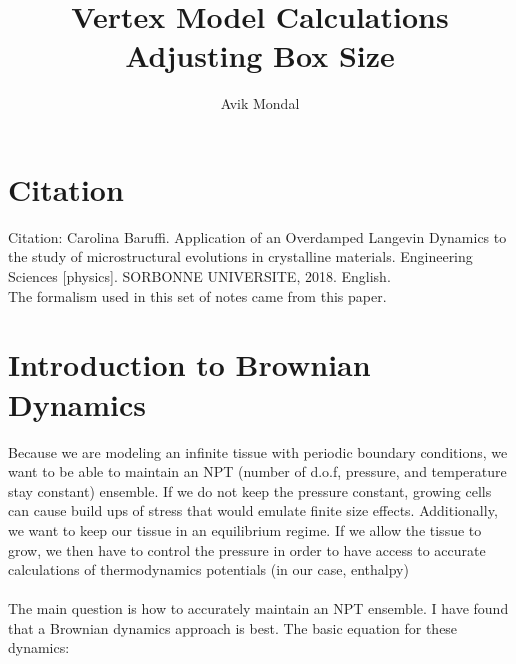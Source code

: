 \documentclass[12pt]{article}
\begin{document}
\title{ Vertex Model Calculations \\ {\normalsize Adjusting Box Size}}
\author{Avik Mondal}
\maketitle 
\tableofcontents
\section{Citation}
Citation: Carolina Baruffi. Application of an Overdamped Langevin Dynamics to the study of microstructural evolutions in crystalline materials. Engineering Sciences [physics]. SORBONNE UNIVERSITE, 2018.
English.\\ 
The formalism used in this set of notes came from this paper. 

\section{Introduction to Brownian Dynamics}
Because we are modeling an infinite tissue with periodic boundary conditions, we want to be able to maintain an NPT (number of d.o.f, pressure, and temperature stay constant) ensemble.  If we do not keep the pressure constant, growing cells can cause build ups of stress that would emulate finite size effects. Additionally, we want to keep our tissue in an equilibrium regime. If we allow the tissue to grow, we then have to control the pressure in order to have access to accurate calculations of thermodynamics potentials (in our case, enthalpy) \\ \\
The main question is how to accurately maintain an NPT ensemble. I have found that a Brownian dynamics approach is best. The basic equation for these dynamics:
\end{document}
